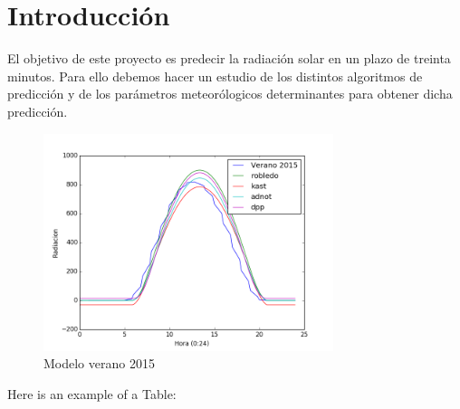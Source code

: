 \cleardoublepage

\chapter{Introducción}
\label{makereference}

El objetivo de este proyecto es predecir la radiación solar en un plazo de treinta minutos. Para ello debemos hacer un estudio de los distintos algoritmos de predicción y de los parámetros meteorólogicos determinantes para obtener dicha predicción.

\begin{figure}[htb]%
	
	\begin{center}
		\includegraphics[height=2.5in]{figures/verano2015.png}
		\caption{Modelo verano 2015}
	\end{center}
    
    \label{figure1}
\end{figure}


Here is an example of a Table:

